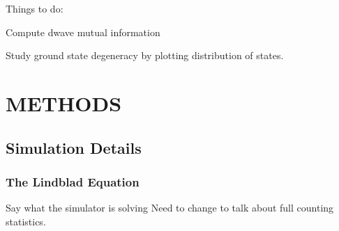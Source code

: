 \documentclass[prd,twocolumn,tightenlines,preprintnumbers,showpacs,superscriptaddress,notitlepage,nofootinbib,eqsecnum,floatfix,longbibliography]{revtex4}
\begin{document}
Things to do:

Compute dwave mutual information

Study ground state degeneracy by plotting distribution of states.

\section{METHODS}
\subsection{Simulation Details}
\subsubsection{The Lindblad Equation}
\label{sec:methods:lindblad}
Say what the simulator is solving
{\color{red} Need to change to talk about full counting statistics.}
\end{document}
